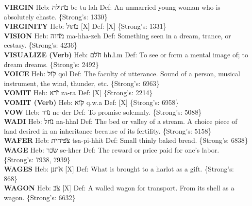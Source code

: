 {\textbf{VIRGIN} Heb: {\large\H בתולה} be-tu-lah Def: An unmarried young woman who is absolutely chaste. \{Strong's: 1330\}\hfill{}\\

\textbf{VIRGINITY} Heb: {\large\H בתול} {[}X{]} Def: {[}X{]} \{Strong's: 1331\}\hfill{}\\

\textbf{VISION} Heb: {\large\H מחזה} ma-hha-zeh Def: Something seen in a dream, trance, or ecstasy. \{Strong's: 4236\}\hfill{}\\

\textbf{VISUALIZE (Verb)} Heb: {\large\H חלם} hh.l.m Def: To see or form a mental image of; to dream dreams. \{Strong's: 2492\}\hfill{}\\

\textbf{VOICE} Heb: {\large\H קול} qol Def: The faculty of utterance. Sound of a person, musical instrument, the wind, thunder, etc. \{Strong's: 6963\}\hfill{}\\

\textbf{VOMIT} Heb: {\large\H זרא} za-ra Def: {[}X{]} \{Strong's: 2214\}\hfill{}\\

\textbf{VOMIT (Verb)} Heb: {\large\H קוא} q.w.a Def: {[}X{]} \{Strong's: 6958\}\hfill{}\\

\textbf{VOW} Heb: {\large\H נדר} ne-der Def: To promise solemnly. \{Strong's: 5088\}\hfill{}\\

\textbf{WADI} Heb: {\large\H נחל} na-hhal Def: The bed or valley of a stream. A choice piece of land desired in an inheritance because of its fertility. \{Strong's: 5158\}\hfill{}\\

\textbf{WAFER} Heb: {\large\H צפיחית} tsa-pi-hhit Def: Small thinly baked bread. \{Strong's: 6838\}\hfill{}\\

\textbf{WAGE} Heb: {\large\H שכר} se-kher Def: The reward or price paid for one's labor. \{Strong's: 7938, 7939\}\hfill{}\\

\textbf{WAGES} Heb: {\large\H אתנן} {[}X{]} Def: What is brought to a harlot as a gift. \{Strong's: 868\}\hfill{}\\

\textbf{WAGON} Heb: {\large\H צב} {[}X{]} Def: A walled wagon for transport. From its shell as a wagon. \{Strong's: 6632\}\hfill{}\\

}
